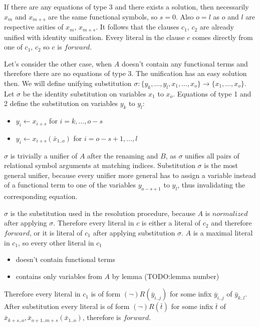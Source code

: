 \documentclass[english, shortabstract]{iithesis}
\theoremstyle{definition} \newtheorem{definition}{Definition}[chapter]
\theoremstyle{remark} \newtheorem{remark}[definition]{Observation}
\theoremstyle{plain} \newtheorem{theorem}[definition]{Theorem}
\theoremstyle{plain} \newtheorem{lemma}[definition]{Lemma}
\begin{document}
If there are any equations of type 3 and there exists a solution, then
necessarily $x_m$ and $x_{m+s}$ are the same functional symbols, so $s=0$. Also $o=l$ as $o$ and $l$ are respective arities of $x_{m}$, $x_{m+s}$.
It follows that the clauses $c_1$, $c_2$ are already unified with identity unification. Every literal in the clause $c$ comes directly from one of $c_1$, $c_2$ so $c$ is $forward$.

Let's consider the other case, when $A$ doesn't contain any functional terms and therefore there are no equations of type 3.
The unification has an easy solution then.%
We will define unifying substitution $\sigma : \{y_k,\dots,y_l, x_1, \dots, x_o\} \rightarrow \{x_1, \dots, x_o\}$.
Let $\sigma$ be the identity substitution on variables $x_1$ to $x_o$.
Equations of type 1 and 2 define the substitution on variables $y_k$ to $y_l$:
\begin{itemize}
    \item $y_i \leftarrow x_{i+s}$ for $i=k,\dots, o-s$
    \item $y_i \leftarrow x_{i+s}(\bar{x}_{1..o})$ for $i=o-s+1,\dots, l$
\end{itemize}
$\sigma$ is trivially a unifier of $A$ after the renaming and $B$, as
$\sigma$ unifies all pairs of relational symbol arguments at matching indices.
Substitution $\sigma$ is the most general unifier, because every unifier more general
has to assign a variable instead of a functional term to one of the variables $y_{o-s+1}$ to $y_l$, 
thus invalidating the corresponding equation. 

$\sigma$ is the substitution used in the resolution procedure, because $A$ is $normalized$ after applying $\sigma$.
Therefore every literal in $c$ is either a literal of $c_2$ and therefore $forward$, or it is 
literal of $c_1$ after applying substitution $\sigma$.
$A$ is a maximal literal in $c_1$, so every other literal in $c_1$ 
\begin{itemize}
    \item doesn't contain functional terms
    \item contains only variables from $A$ by lemma (TODO:lemma number)
\end{itemize}
Therefore every literal in $c_1$ is of form $(\lnot)R(\bar{y}_{i..j})$ for some infix $\bar{y}_{i..j}$ of $\bar{y}_{k..l}$.
After substitution every literal is of form $(\lnot)R(\bar{t})$ for some infix $\bar{t}$ of $\bar{x}_{k+s..o}, \bar{x}_{{o+1..m+s}}(\bar{x}_{1..o})$, therefore is $forward$.
\end{document}
